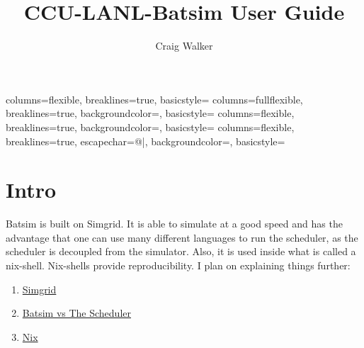 \documentclass[titlepage]{article}
\author{Craig Walker}
\title{CCU-LANL-Batsim User Guide}
\let\oldsection\section
\renewcommand\section{\clearpage\oldsection}
\newenvironment{regular}{\color{black}}{}
\begin{document}
\sffamily
\allsectionsfont{\normalfont\sffamily\bfseries}


{
 	columns=flexible,
 	breaklines=true,
    basicstyle={\normalsize\color{black}\sffamily}
}
{
 	columns=fullflexible,
 	breaklines=true,
	backgroundcolor=\color{black!15},
    basicstyle=\small\color{myTerminalRed}\ttfamily
}
{
 	columns=flexible,
 	breaklines=true,
	backgroundcolor=\color{black!15},
    basicstyle=\small\color{myTerminalRed}\ttfamily
}
{
	columns=flexible,
	breaklines=true,
	escapechar=@|,
	backgroundcolor=\color{codelist!50},
    basicstyle=\small\ttfamily
}


\maketitle
\hypersetup{linkcolor=blue,urlcolor=blue,anchorcolor=blue}
\tableofcontents
\pagebreak

\section{Intro}
\begin{regular}
Batsim is built on Simgrid.  It is able to simulate at a good speed and has the advantage that
one can use many different languages to run the scheduler, as the scheduler is decoupled from the simulator.
Also, it is used inside what is called a nix-shell.  Nix-shells provide reproducibility.  I plan on explaining things
further:
\begin{enumerate}
\item \hyperlink{intro_simgrid}{Simgrid}
\item \hyperlink{intro_batsim_vs_batsched}{Batsim vs The Scheduler}
\item \hyperlink{intro_nix}{Nix}
\end{enumerate}
\end{regular}

\hypertarget{intro_simgrid}{}
\end{document}
